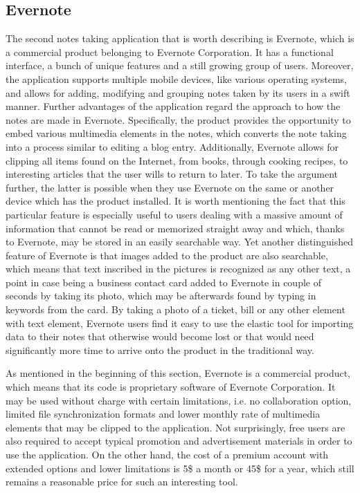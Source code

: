 \subsection{Evernote}\label{subsec:evernote}
The second notes taking application that is worth describing is Evernote, which is a commercial product belonging to Evernote Corporation. It has a functional interface, a bunch of unique features and a still growing group of users. Moreover, the application supports multiple mobile devices, like various operating systems, and allows for adding, modifying and grouping notes taken by its users in a swift manner. Further advantages of the application regard the approach to how the notes are made in Evernote. Specifically, the product provides the opportunity to embed various multimedia elements in the notes, which converts the note taking into a process similar to editing a blog entry. Additionally, Evernote allows for clipping all items found on the Internet, from books, through cooking recipes, to interesting articles that the user wills to return to later. To take the argument further, the latter is possible when they use Evernote on the same or another device which has the product installed. It is worth mentioning the fact that this particular feature is especially useful to users dealing with a massive amount of information that cannot be read or memorized straight away and which, thanks to Evernote, may be stored in an easily searchable way. Yet another distinguished feature of Evernote is that images added to the product are also searchable, which means that text inscribed in the pictures is recognized as any other text, a point in case being a business contact card added to Evernote in couple of seconds by taking its photo, which may be afterwards found by typing in keywords from the card. By taking a photo of a ticket, bill or any other element with text element, Evernote users find it easy to use the elastic tool for importing data to their notes that otherwise would become lost or that would need significantly more time to arrive onto the product in the traditional way.

As mentioned in the beginning of this section, Evernote is a commercial product, which means that its code is proprietary software of Evernote Corporation. It may be used without charge with certain limitations, i.e. no collaboration option, limited file synchronization formats and lower monthly rate of multimedia elements that may be clipped to the application. Not surprisingly, free users are also required to accept typical promotion and advertisement materials in order to use the application. On the other hand, the cost of a premium account with extended options and lower limitations is 5\$ a month or 45\$ for a year, which still remains a reasonable price for such an interesting tool.      
 
